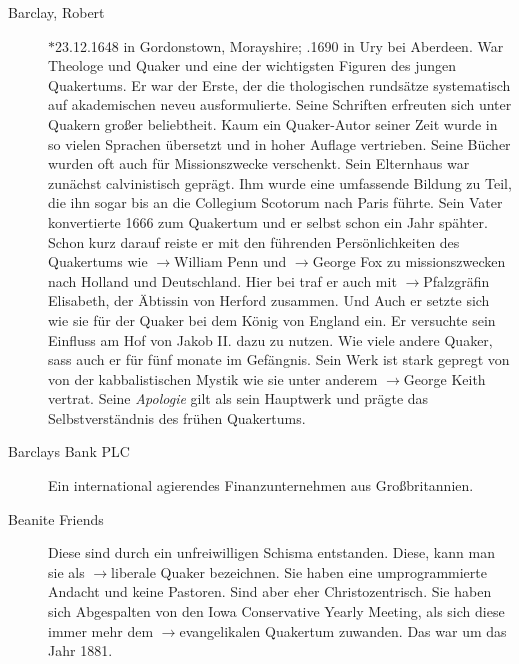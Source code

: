 \begin{description}
 \item[Barclay, Robert] $\ast$23.12.1648 in Gordonstown, Morayshire; .1690 in Ury bei Aberdeen. War Theologe und Quaker und eine der wichtigsten Figuren des jungen Quakertums. Er war der Erste, der die thologischen rundsätze systematisch auf akademischen neveu ausformulierte. Seine Schriften erfreuten sich unter Quakern großer beliebtheit. Kaum ein Quaker-Autor seiner Zeit wurde in so vielen Sprachen übersetzt und in hoher Auflage vertrieben. Seine Bücher wurden oft auch für Missionszwecke verschenkt. Sein Elternhaus war zunächst calvinistisch geprägt. Ihm wurde eine umfassende Bildung zu Teil, die ihn sogar bis an die Collegium Scotorum nach Paris führte. Sein Vater konvertierte 1666 zum Quakertum und er selbst schon ein Jahr spähter. Schon kurz darauf reiste er mit den führenden Persönlichkeiten des Quakertums wie $\to$William Penn und $\to$George Fox zu missionszwecken nach Holland und Deutschland. Hier bei traf er auch mit $\to$Pfalzgräfin Elisabeth, der Äbtissin von Herford zusammen. Und Auch er setzte sich wie sie für der Quaker bei dem König von England ein. Er versuchte sein Einfluss am Hof von Jakob II. dazu zu nutzen. Wie viele andere Quaker, sass auch er für fünf monate im Gefängnis. Sein Werk ist stark gepregt von von der kabbalistischen Mystik wie sie unter anderem $\to$George Keith vertrat. Seine \textit{Apologie} gilt als sein Hauptwerk und prägte das Selbstverständnis des frühen Quakertums.  

 \item[Barclays Bank PLC] Ein international agierendes Finanzunternehmen aus Großbritannien.

 \item[Beanite Friends]
 Diese sind durch ein unfreiwilligen Schisma entstanden. Diese, kann man sie als $\to$liberale Quaker bezeichnen. Sie haben eine umprogrammierte Andacht und keine Pastoren. Sind aber eher Christozentrisch. Sie haben sich Abgespalten von den Iowa Conservative Yearly Meeting, als sich diese immer mehr dem $\to$evangelikalen Quakertum zuwanden. Das war um das Jahr 1881. 



\end{description}
